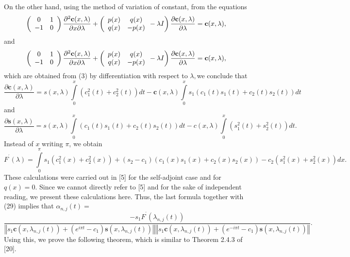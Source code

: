 \documentclass{article}%
\begin{document}
On the other hand, using the method of variation of constant, from the
equations
\[
\left(
\begin{array}
[c]{cc}%
0 & 1\\
-1 & 0
\end{array}
\right)  \frac{\partial^{2}\mathbf{c}(x,\lambda)}{\partial x\partial\lambda
}+\left(
\begin{array}
[c]{cc}%
p(x) & q(x)\\
q(x) & -p(x)
\end{array}
-\lambda I\right)  \frac{\partial\mathbf{c}(x,\lambda)}{\partial\lambda
}=\mathbf{c}(x,\lambda),
\]
and
\[
\left(
\begin{array}
[c]{cc}%
0 & 1\\
-1 & 0
\end{array}
\right)  \frac{\partial^{2}\mathbf{c}(x,\lambda)}{\partial x\partial\lambda
}+\left(
\begin{array}
[c]{cc}%
p(x) & q(x)\\
q(x) & -p(x)
\end{array}
-\lambda I\right)  \frac{\partial\mathbf{c}(x,\lambda)}{\partial\lambda
}=\mathbf{c}(x,\lambda),
\]
which are obtained from (3) by differentiation with respect to $\lambda,$we
conclude that%
\[
\frac{\partial\mathbf{c}(x,\lambda)}{\partial\lambda}=s(x,\lambda
)\int\limits_{0}^{x}\left(  c_{1}^{2}(t)+c_{2}^{2}(t)\right)  dt-\mathbf{c}%
(x,\lambda)\int\limits_{0}^{x}s_{1}(c_{1}(t)s_{1}(t)+c_{2}(t)s_{2}(t))dt
\]
and
\[
\frac{\partial\mathbf{s}(x,\lambda)}{\partial\lambda}=s(x,\lambda
)\int\limits_{0}^{x}(c_{1}(t)s_{1}(t)+c_{2}(t)s_{2}(t))dt-c(x,\lambda
)\int\limits_{0}^{x}\left(  s_{1}^{2}(t)+s_{2}^{2}(t)\right)  dt.
\]
Instead of $x$ writing $\pi$, we obtain
\[
F^{^{\prime}}(\lambda)=\int\limits_{0}^{\pi}s_{1}\left(  c_{1}^{2}%
(x)+c_{2}^{2}(x)\right)  +\left(  s_{2}-c_{1}\right)  (c_{1}(x)s_{1}%
(x)+c_{2}(x)s_{2}(x))-c_{2}\left(  s_{1}^{2}(x)+s_{2}^{2}(x)\right)  dx.
\]
These calculations were carried out in [5] for the self-adjoint case and for
$q(x)=0.$ Since we cannot directly refer to [5] and for the sake of
independent reading, we present these calculations here. Thus, the last
formula together with (29) implies that $\alpha_{n,j}(t)=$
\begin{equation}
\frac{-s_{1}F^{^{\prime}}(\lambda_{n,j}(t))}{\left\Vert s_{1}\mathbf{c}%
(x,\lambda_{n,j}(t))+\left(  e^{i\pi t}-c_{1}\right)  \mathbf{s}%
(x,\lambda_{n,j}(t))\right\Vert \left\Vert s_{1}\mathbf{c}(x,\lambda
_{n,j}(t))+\left(  e^{-i\pi t}-c_{1}\right)  \mathbf{s}(x,\lambda
_{n,j}(t))\right\Vert }. \tag{30}%
\end{equation}
Using this, we prove the following theorem, which is similar to Theorem 2.4.3
of [20].
\end{document}
